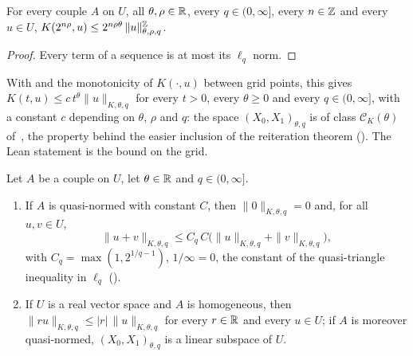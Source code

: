 \begin{lemma}
\label{lem:couple-class-ck}
\leanok
{}
For every couple $A$ on $U$, all $\theta, \rho \in \mathbb{R}$, every $q \in (0, \infty]$, every
$n \in \mathbb{Z}$ and every $u \in U$,
$K(2^{n\rho}, u) \leq 2^{n\rho\theta} \, \|u\|^{\mathbb{Z}}_{\theta, \rho, q}$.
\end{lemma}

\begin{proof}
\leanok
Every term of a sequence is at most its $\ell_q$ norm.
\end{proof}

With  and the monotonicity of $K(\cdot, u)$ between grid
points, this gives $K(t, u) \leq c \, t^{\theta} \|u\|_{K, \theta, q}$ for every $t > 0$, every
$\theta \geq 0$ and every $q \in (0, \infty]$, with a constant $c$ depending on $\theta$, $\rho$ and
$q$: the space $(X_0, X_1)_{\theta, q}$ is of class $\mathcal{C}_K(\theta)$
of~\cite[Definition~3.5.1]{BerghLofstrom}, the property behind the easier inclusion of the
reiteration theorem (). The Lean statement is the bound on the grid.

\begin{proposition}
\label{prop:couple-k-method-space}
\leanok
{}
Let $A$ be a couple on $U$, let $\theta \in \mathbb{R}$ and $q \in (0, \infty]$.
\begin{enumerate}
  \item If $A$ is quasi-normed with constant $C$, then $\|0\|_{K, \theta, q} = 0$ and, for all
    $u, v \in U$,
    \[
      \|u + v\|_{K, \theta, q}
      \leq C_q \, C \bigl(\|u\|_{K, \theta, q} + \|v\|_{K, \theta, q}\bigr) ,
    \]
    with $C_q = \max(1, 2^{1/q - 1})$, $1/\infty = 0$, the constant of the quasi-triangle
    inequality in $\ell_q$ ().
  \item If $U$ is a real vector space and $A$ is homogeneous, then
    $\|r u\|_{K, \theta, q} \leq |r| \, \|u\|_{K, \theta, q}$ for every $r \in \mathbb{R}$ and every
    $u \in U$; if $A$ is moreover quasi-normed, $(X_0, X_1)_{\theta, q}$ is a linear subspace
    of $U$.
\end{enumerate}
\end{proposition}


